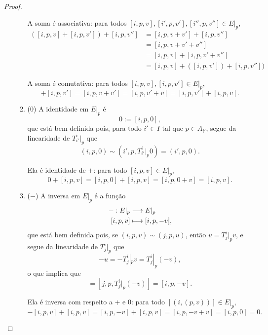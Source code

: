 \begin{proof}
\begin{enumerate}
\begin{enumerate}
A soma é associativa: para todos $[i,p,v], [i',p,v'], [i'',p,v''] \in E|_p$,
	\begin{align*}
	([i,p,v] + [i,p,v']) + [i,p,v''] &= [i,p,v + v'] + [i,p,v''] \\
		&= [i,p,v + v' + v''] \\
		&= [i,p,v] + [i,p,v' + v''] \\
		&= [i,p,v] + ([i,p,v']) + [i,p,v''])
	\end{align*}

A soma é comutativa: para todos $[i,p,v], [i,p,v'] \in E|_p$,
	\begin{equation*}
	[i,p,v] + [i,p,v'] = [i,p,v + v'] = [i,p,v' + v] = [i,p,v'] + [i,p,v].
	\end{equation*}
	
	\item ($0$) A identidade em $E|_p$ é
	\begin{equation*}
	0 := [i,p,0],
	\end{equation*}
que está bem definida pois, para todo $i' \in I$ tal que $p \in A_{i'}$, segue da linearidade de $T^i_{i'}|_p$ que
	\begin{equation*}
	(i,p,0) \sim (i',p,T^i_{i'}|_p 0) = (i',p,0).
	\end{equation*}

Ela é identidade de $+$: para todo $[i,p,v] \in E|_p$,
	\begin{equation*}
	0 + [i,p,v] = [i,p,0] + [i,p,v] = [i,p,0 + v] = [i,p,v].
	\end{equation*}
	
	\item ($-$) A inversa em $E|_p$ é a função
	\begin{align*}
	{-}: {E|_p} &\longrightarrow {E|_p} \\{[i,p,v]} &\longmapsto {[i,p,-v]},
	\end{align*}
que está bem definida pois, se $(i,p,v) \sim (j,p,u)$, então $u=T^i_j|_p v$, e segue da linearidade de $T^i_j|_p$ que
	\begin{equation*}
	-u = -T^i_j|_p v = T^i_j|_p (-v),
	\end{equation*}
o que implica que
	\begin{equation*}
	[j,p,-u] = [j,p,T^i_j|_p (-v)] = [i,p,-v].
	\end{equation*}

Ela é inversa com respeito a $+$ e $0$: para todo $[(i,(p,v))] \in E|_p$,
	\begin{equation*}
	-[i,p,v] + [i,p,v] = [i,p,-v] + [i,p,v] = [i,p,-v+v] = [i,p,0] = 0.
	\end{equation*}
	\end{enumerate}


\end{enumerate}
\end{proof}
